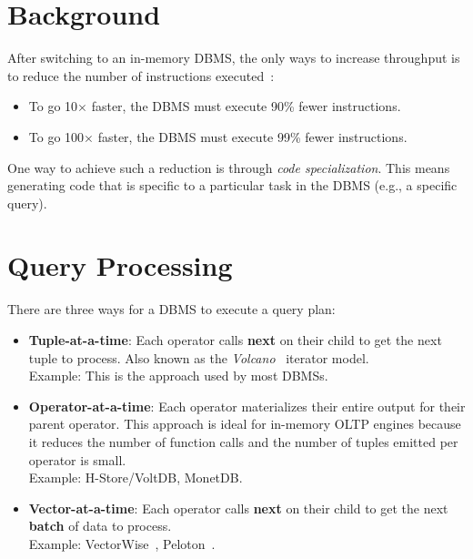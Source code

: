 \documentclass[11pt]{article}
\begin{document}
\maketitle
\thispagestyle{plain}

\section{Background}
After switching to an in-memory DBMS, the only ways to increase throughput is to reduce the 
number of instructions executed~\cite{freedman14}:
\begin{itemize}
    \item
    To go 10$\times$ faster, the DBMS must execute 90\% fewer instructions.
    
    \item
    To go 100$\times$ faster, the DBMS must execute 99\% fewer instructions.
\end{itemize}
    
One way to achieve such a reduction is through \textit{code specialization}. This means generating 
code that is specific to a particular task in the DBMS (e.g., a specific query).

\section{Query Processing}
There are three ways for a DBMS to execute a query plan:
\begin{itemize}
    \item \textbf{Tuple-at-a-time}:
    Each operator calls \textbf{next} on their child to get the next tuple to process. 
    Also known as the \textit{Volcano}~\cite{graefe94} iterator model. \\
    Example: This is the approach used by most DBMSs.
    
    \item \textbf{Operator-at-a-time}:
    Each operator materializes their entire output for their parent operator.
    This approach is ideal for in-memory OLTP engines because it reduces the number of function 
    calls and the number of tuples emitted per operator is small. \\
    Example: H-Store/VoltDB, MonetDB.
    
    \item \textbf{Vector-at-a-time}:
    Each operator calls \textbf{next} on their child to get the next \textbf{batch} of data to 
    process. \\
    Example: VectorWise~\cite{bonc05}, Peloton~\cite{menon17}.
\end{itemize}
    
\end{document}
